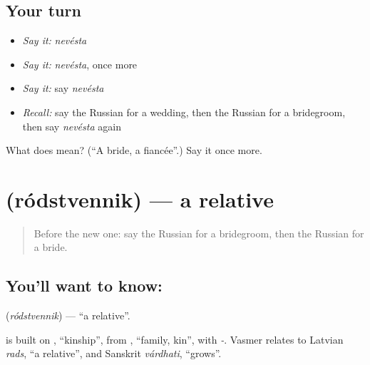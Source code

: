 \subsection*{Your turn}
\begin{itemize}
\raggedright
  \item \emph{Say it:} \emph{nevésta}
  \item \emph{Say it:} \emph{nevésta}, once more
  \item \emph{Say it:} say \emph{nevésta}
  \item \emph{Recall:} say the Russian for a wedding, then the Russian for a bridegroom, then say \emph{nevésta} again
\end{itemize}

\begin{tcolorbox}[breakable,colback=teal!4,colframe=teal!35!black,title={Before you move on}]
What does  mean? (\textquotedblleft{}A bride, a fiancée\textquotedblright{}.) Say it once more.
\end{tcolorbox}
\section[\texorpdfstring{\ru{родственник} (ródstvennik)}{родственник (ródstvennik)}]{ (ródstvennik) — a relative}

\label{lesson:RU-C168-rodstvennik}



\begin{quote}
Before the new one: say the Russian for a bridegroom, then the Russian for a bride.
\end{quote}

\subsection*{You'll want to know: }
\textbf{} (\emph{ródstvennik}) — \textquotedblleft{}a relative\textquotedblright{}.

\begin{cousinweb}
\textbf{} is built on \emph{}, \textquotedblleft{}kinship\textquotedblright{}, from \emph{}, \textquotedblleft{}family, kin\textquotedblright{}, with \emph{-}. Vasmer relates \emph{} to Latvian \emph{rads}, \textquotedblleft{}a relative\textquotedblright{}, and Sanskrit \emph{várdhati}, \textquotedblleft{}grows\textquotedblright{}.
\end{cousinweb}

